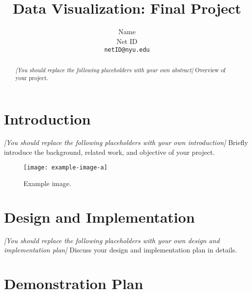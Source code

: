 \documentclass[10pt,twocolumn,letterpaper]{article}
\newcommand{\note}[1]{{\it\color{red} #1}}
\begin{document}
\title{Data Visualization: Final Project}
\author{Name\\Net ID\\{\tt\small netID@nyu.edu}}
\maketitle


\begin{abstract}

\note{[You should replace the following placeholders with your own abstract]}
Overview of your project. 

\end{abstract}


\section{Introduction}
\label{sec:introduction}

\note{[You should replace the following placeholders with your own introduction]}
Briefly introduce the background, related work, and objective of your project. 


\begin{figure}[!t]
  \centering
  \texttt{[image: example-image-a]}
  \caption{Example image.}
  \label{fig:example}
\end{figure}


\section{Design and Implementation}
\label{sec:design}

\note{[You should replace the following placeholders with your own design and implementation plan]}
Discuss your design and implementation plan in details. 


\section{Demonstration Plan}
\label{sec:evaluation}
\end{document}
